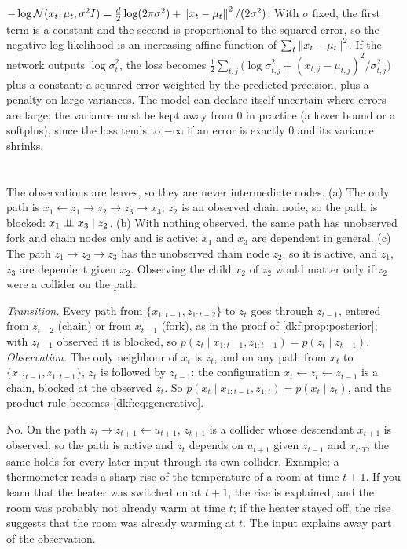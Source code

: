 $-\log\mathcal N(x_t;\mu_t,\sigma^2I) = \frac d2\log(2\pi\sigma^2) + \left\|x_t - \mu_t\right\|^2/(2\sigma^2)$. With $\sigma$ fixed, the first term is a constant and the second
is proportional to the squared error, so the negative log-likelihood is an increasing affine
function of $\sum_t\left\|x_t - \mu_t\right\|^2$. If the network outputs $\log\sigma_t^2$, the loss becomes
$\frac12\sum_{t,j}\bigl(\log\sigma_{t,j}^2 + (x_{t,j} - \mu_{t,j})^2/\sigma_{t,j}^2\bigr)$ plus a constant: a squared error weighted by the predicted
precision, plus a penalty on large variances. The model can declare itself uncertain where
errors are large; the variance must be kept away from $0$ in practice (a lower bound or a
softplus), since the loss tends to $-\infty$ if an error is exactly $0$ and its variance shrinks.

\section{}

The observations are leaves, so they are never intermediate nodes. (a) The only path is
$x_1\leftarrow z_1\to z_2\to z_3\to x_3$; $z_2$ is an observed chain node, so the path is blocked: $x_1\mathrel{\perp\!\!\!\perp} x_3\mid z_2$. (b) With nothing
observed, the same path has unobserved fork and chain nodes only and is active: $x_1$ and $x_3$ are
dependent in general. (c) The path $z_1\to z_2\to z_3$ has the unobserved chain node $z_2$, so it is active, and
$z_1$, $z_3$ are dependent given $x_2$. Observing the child $x_2$ of $z_2$ would matter only if $z_2$ were a collider on the
path.

\emph{Transition.} Every path from $\{x_{1:t-1}, z_{1:t-2}\}$ to $z_t$ goes through $z_{t-1}$, entered from $z_{t-2}$ (chain) or from $x_{t-1}$
(fork), as in the proof of \cref{dkf:prop:posterior}; with $z_{t-1}$ observed it is blocked, so
$p(z_t\mid x_{1:t-1}, z_{1:t-1}) = p(z_t\mid z_{t-1})$. \emph{Observation.} The only neighbour of $x_t$ is $z_t$, and on any path from $x_t$ to
$\{x_{1:t-1}, z_{1:t-1}\}$, $z_t$ is followed by $z_{t-1}$: the configuration $x_t\leftarrow z_t\leftarrow z_{t-1}$ is a chain, blocked at the observed
$z_t$. So $p(x_t\mid x_{1:t-1}, z_{1:t}) = p(x_t\mid z_t)$, and the product rule becomes \cref{dkf:eq:generative}.

No. On the path $z_t\to z_{t+1}\leftarrow u_{t+1}$, $z_{t+1}$ is a collider whose descendant $x_{t+1}$ is observed, so the path is
active and $z_t$ depends on $u_{t+1}$ given $z_{t-1}$ and $x_{t:T}$; the same holds for every later input through its
own collider. Example: a thermometer reads a sharp rise of the temperature of a room at
time $t+1$. If you learn that the heater was switched on at $t+1$, the rise is explained, and the
room was probably not already warm at time $t$; if the heater stayed off, the rise suggests that
the room was already warming at $t$. The input explains away part of the observation.

